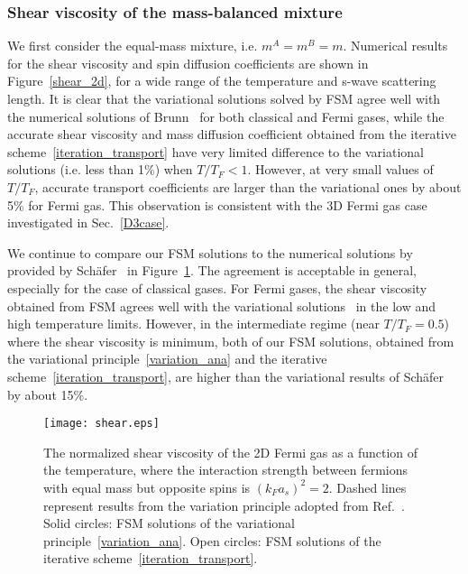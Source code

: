 \subsubsection{Shear viscosity of the mass-balanced mixture}

We first consider the equal-mass mixture, i.e. $m^A=m^B=m$. Numerical results for the shear viscosity and spin diffusion coefficients are shown in Figure~\ref{shear_2d}, for a wide range of the temperature and s-wave scattering length. It is clear that the variational solutions solved by FSM agree well with the numerical solutions of Brunn~\cite{bruun_2012} for both classical and Fermi gases, while the accurate shear viscosity and mass diffusion coefficient obtained from the iterative scheme~\eqref{iteration_transport} have very limited difference to the variational solutions (i.e. less than 1\%) when $T/T_F<1$. However, at very small values of $T/T_F$, accurate transport coefficients are larger than the variational ones by about 5\% for Fermi gas. This observation is consistent with the 3D Fermi gas case investigated in Sec.~\ref{D3case}. 



%

We continue to compare our FSM solutions 
to the numerical solutions by provided by Sch\"{a}fer~\cite{arxiv_sch} in Figure~\ref{shear_2d_schafer}. The agreement is acceptable in general, especially for the case of classical gases. For Fermi gases, the shear viscosity obtained from FSM agrees well with the variational solutions~\cite{arxiv_sch} in the low and high temperature limits. However, in the intermediate regime (near $T/T_F=0.5$) where the shear viscosity is minimum, both of our FSM solutions, obtained from the variational principle~\eqref{variation_ana} and the iterative scheme~\eqref{iteration_transport}, are higher than the variational results of Sch\"{a}fer~\cite{arxiv_sch} by about 15\%.


\begin{figure}[t]
	\centering
	\texttt{[image: shear.eps]}
	\caption{The normalized shear viscosity of the 2D Fermi gas as a function of the temperature, where the interaction strength between fermions with equal mass but opposite spins is $(k_Fa_s)^2={2}$. Dashed lines represent results from the variation principle adopted from Ref.~\cite{arxiv_sch}. Solid circles:  FSM solutions of the variational principle~\eqref{variation_ana}. Open circles: FSM solutions of the iterative scheme~\eqref{iteration_transport}.}\label{shear_2d_schafer}
\end{figure}









